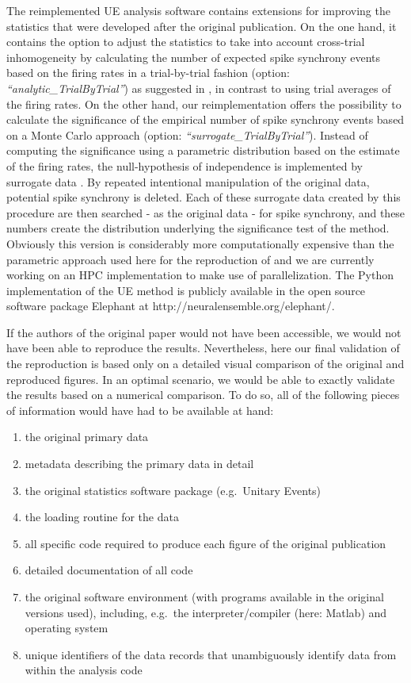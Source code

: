 \documentclass[10pt,a4paper,onecolumn]{article}
\begin{document}
The reimplemented UE analysis software contains extensions for improving
the statistics that were developed after the original publication. On
the one hand, it contains the option to adjust the statistics to take
into account cross-trial inhomogeneity by calculating the number of
expected spike synchrony events based on the firing rates in a
trial-by-trial fashion (option: \emph{``analytic\_TrialByTrial''}) as
suggested in \autocite{Gruen03b}, in contrast to using trial averages of
the firing rates. On the other hand, our reimplementation offers the
possibility to calculate the significance of the empirical number of
spike synchrony events based on a Monte Carlo approach (option:
\emph{``surrogate\_TrialByTrial''}). Instead of computing the
significance using a parametric distribution based on the estimate of
the firing rates, the null-hypothesis of independence is implemented by
surrogate data \autocites{Gruen09}{GruenRotter10_Chap10}{Louis10}. By
repeated intentional manipulation of the original data, potential spike
synchrony is deleted. Each of these surrogate data created by this
procedure are then searched - as the original data - for spike
synchrony, and these numbers create the distribution underlying the
significance test of the method. Obviously this version is considerably
more computationally expensive than the parametric approach used here
for the reproduction of \autocite{Riehle97} and we are currently working
on an HPC implementation to make use of parallelization. The Python
implementation of the UE method is publicly available in the open source
software package Elephant at http://neuralensemble.org/elephant/.

If the authors of the original paper would not have been accessible, we
would not have been able to reproduce the results. Nevertheless, here
our final validation of the reproduction is based only on a detailed
visual comparison of the original and reproduced figures. In an optimal
scenario, we would be able to exactly validate the results based on a
numerical comparison. To do so, all of the following pieces of
information would have had to be available at hand:

\begin{enumerate}
\def\labelenumi{\arabic{enumi}.}
\item
  the original primary data
\item
  metadata describing the primary data in detail
\item
  the original statistics software package (e.g.~Unitary Events)
\item
  the loading routine for the data
\item
  all specific code required to produce each figure of the original
  publication
\item
  detailed documentation of all code
\item
  the original software environment (with programs available in the
  original versions used), including, e.g.~the interpreter/compiler
  (here: Matlab) and operating system
\item
  unique identifiers of the data records that unambiguously identify
  data from within the analysis code
\end{enumerate}
\end{document}
